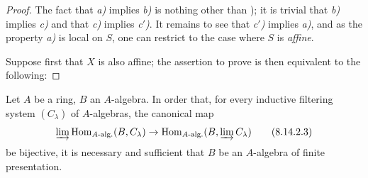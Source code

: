 \begin{proof}
The fact that \emph{a)} implies \emph{b)} is nothing other than ); it is trivial that \emph{b)} implies \emph{c)} and that \emph{c)} implies \emph{c$'$)}.
It remains to see that \emph{c$'$)} implies \emph{a)}, and as the property \emph{a)} is local on $S$, one can restrict to the case where $S$ is \emph{affine}.

Suppose first that $X$ is also affine; the assertion to prove is then equivalent to the following:
\end{proof}

\begin{corollary}[8.14.2.2]
\label{IV.8.14.2.2}
Let $A$ be a ring, $B$ an $A$-algebra.
In order that, for every inductive filtering system $(C_\lambda)$ of $A$-algebras, the canonical map
\begin{equation}
\label{IV.8.14.2.3}
\varinjlim\operatorname{Hom}_{A\text{-}\mathrm{alg.}}(B,C_\lambda)\to\operatorname{Hom}_{A\text{-}\mathrm{alg.}}(B,\varinjlim C_\lambda) \tag{8.14.2.3}
\end{equation}
be bijective, it is necessary and sufficient that $B$ be an $A$-algebra of finite presentation.
\end{corollary}

